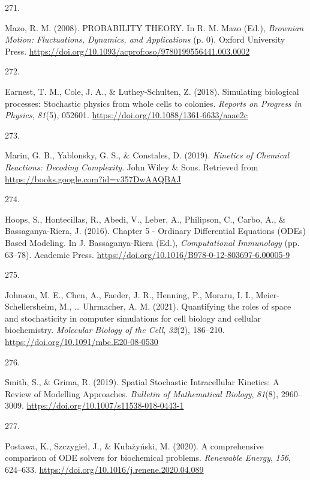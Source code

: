 \documentclass[
  11pt,
  letterpaper,
]{scrreprt}
\newlength{\cslhangindent}
\newlength{\csllabelwidth}
\newenvironment{CSLReferences}[2] %
 {\begin{list}{}{%
  \setlength{\itemindent}{0pt}
  \setlength{\leftmargin}{0pt}
  \setlength{\parsep}{0pt}
  \ifodd #1
   \setlength{\leftmargin}{\cslhangindent}
   \setlength{\itemindent}{-1\cslhangindent}
  \fi
  \setlength{\itemsep}{#2\baselineskip}}}
 {\end{list}}
\newcommand{\CSLLeftMargin}[1]{\parbox[t]{\csllabelwidth}{\strut#1\strut}}
\newcommand{\CSLRightInline}[1]{\parbox[t]{\linewidth - \csllabelwidth}{\strut#1\strut}}
\begin{document}
\begin{CSLReferences}{0}{0}
\CSLLeftMargin{271. }%
\CSLRightInline{Mazo, R. M. (2008). {PROBABILITY THEORY}. In R. M. Mazo
(Ed.), \emph{Brownian {Motion}: {Fluctuations}, {Dynamics}, and
{Applications}} (p. 0). Oxford University Press.
\url{https://doi.org/10.1093/acprof:oso/9780199556441.003.0002}}

\CSLLeftMargin{272. }%
\CSLRightInline{Earnest, T. M., Cole, J. A., \& Luthey-Schulten, Z.
(2018). Simulating biological processes: Stochastic physics from whole
cells to colonies. \emph{Reports on Progress in Physics}, \emph{81}(5),
052601. \url{https://doi.org/10.1088/1361-6633/aaae2c}}

\CSLLeftMargin{273. }%
\CSLRightInline{Marin, G. B., Yablonsky, G. S., \& Constales, D. (2019).
\emph{Kinetics of {Chemical Reactions}: {Decoding Complexity}}. John
Wiley \& Sons. Retrieved from
\url{https://books.google.com?id=v357DwAAQBAJ}}

\CSLLeftMargin{274. }%
\CSLRightInline{Hoops, S., Hontecillas, R., Abedi, V., Leber, A.,
Philipson, C., Carbo, A., \& Bassaganya-Riera, J. (2016). Chapter 5 -
{Ordinary Differential Equations} ({ODEs}) {Based Modeling}. In J.
Bassaganya-Riera (Ed.), \emph{Computational {Immunology}} (pp. 63--78).
Academic Press.
\url{https://doi.org/10.1016/B978-0-12-803697-6.00005-9}}

\CSLLeftMargin{275. }%
\CSLRightInline{Johnson, M. E., Chen, A., Faeder, J. R., Henning, P.,
Moraru, I. I., Meier-Schellersheim, M., \ldots{} Uhrmacher, A. M.
(2021). Quantifying the roles of space and stochasticity in computer
simulations for cell biology and cellular biochemistry. \emph{Molecular
Biology of the Cell}, \emph{32}(2), 186--210.
\url{https://doi.org/10.1091/mbc.E20-08-0530}}

\CSLLeftMargin{276. }%
\CSLRightInline{Smith, S., \& Grima, R. (2019). Spatial {Stochastic
Intracellular Kinetics}: {A Review} of {Modelling Approaches}.
\emph{Bulletin of Mathematical Biology}, \emph{81}(8), 2960--3009.
\url{https://doi.org/10.1007/s11538-018-0443-1}}

\CSLLeftMargin{277. }%
\CSLRightInline{Postawa, K., Szczygieł, J., \& Kułażyński, M. (2020). A
comprehensive comparison of {ODE} solvers for biochemical problems.
\emph{Renewable Energy}, \emph{156}, 624--633.
\url{https://doi.org/10.1016/j.renene.2020.04.089}}


\end{CSLReferences}
\end{document}
